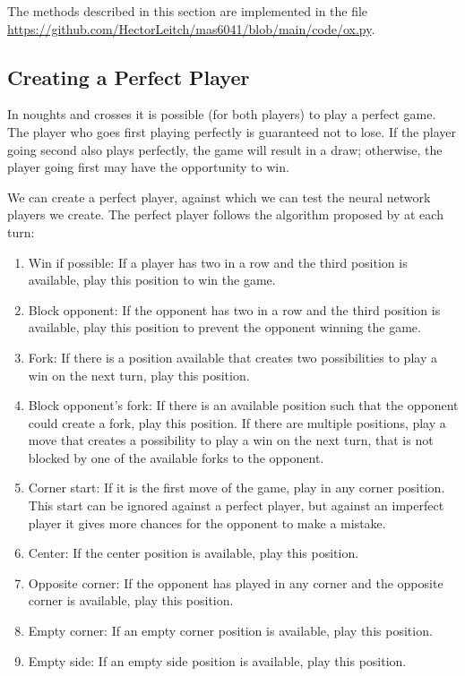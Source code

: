 \documentclass{somasmsc}
\begin{document}
The methods described in this section are implemented in the file \url{https://github.com/HectorLeitch/mas6041/blob/main/code/ox.py}.

\subsection{Creating a Perfect Player}

In noughts and crosses it is possible (for both players) to play a perfect game. The player who goes first playing perfectly is guaranteed not to lose. If the player going second also plays perfectly, the game will result in a draw; otherwise, the player going first may have the opportunity to win.

We can create a perfect player, against which we can test the neural network players we create. The perfect player follows the algorithm proposed by \citet{crowley1993flexible} at each turn:

\begin{enumerate}
    \item Win if possible: If a player has two in a row and the third position is available, play this position to win the game.
    \item Block opponent: If the opponent has two in a row and the third position is available, play this position to prevent the opponent winning the game.
    \item Fork: If there is a position available that creates two possibilities to play a win on the next turn, play this position.
    \item Block opponent's fork: If there is an available position such that the opponent could create a fork, play this position. If there are multiple positions, play a move that creates a possibility to play a win on the next turn, that is not blocked by one of the available forks to the opponent.
    \item Corner start: If it is the first move of the game, play in any corner position. This start can be ignored against a perfect player, but against an imperfect player it gives more chances for the opponent to make a mistake.
    \item Center: If the center position is available, play this position.
    \item Opposite corner: If the opponent has played in any corner and the opposite corner is available, play this position.
    \item Empty corner: If an empty corner position is available, play this position.
    \item Empty side: If an empty side position is available, play this position.
\end{enumerate}
\end{document}
